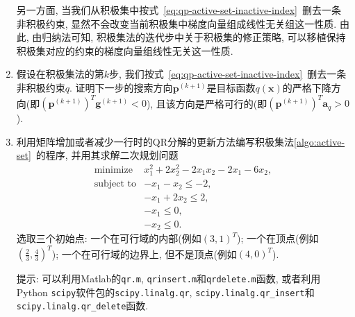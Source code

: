\documentclass{SBCbookchapter}
\newcommand{\V}[1]{{\bm{#1}}}
\numberwithin{equation}{section}
\begin{document}
\begin{enumerate}
另一方面, 当我们从积极集中按式~\eqref{eq:qp-active-set-inactive-index}~删去一条非积极约束, 显然不会改变当前积极集中梯度向量组成线性无关组这一性质. 由此, 由归纳法可知, 积极集法的迭代步中关于积极集的修正策略, 可以移植保持积极集对应的约束的梯度向量组线性无关这一性质.

\item 假设在积极集法的第$k$步, 我们按式~\eqref{eq:qp-active-set-inactive-index}~删去一条非积极约束$q.$ 证明下一步的搜索方向$\V{p}^{(k+1)}$是目标函数$q(\V{x})$的严格下降方向(即$\left( \V{p}^{(k+1)} \right)^T \V{g}^{(k+1)} < 0$), 且该方向是严格可行的(即$\left( \V{p}^{(k+1)} \right)^T \V{a}_q > 0$).

\item 利用矩阵增加或者减少一行时的QR分解的更新方法编写积极集法\ref{algo:active-set}~的程序, 并用其求解二次规划问题
\begin{equation*}
\begin{array}{cl}
\text{minimize} & x_1^2 + 2x_2^2 -2x_1x_2 - 2x_1 - 6x_2, \\
\text{subject to} & -x_1 - x_2 \leqslant -2, \\
& -x_1 + 2x_2 \leqslant 2, \\
& -x_1 \leqslant 0,\\
& -x_2 \leqslant 0.
\end{array}
\end{equation*}
选取三个初始点: 一个在可行域的内部(例如$(3, 1)^T$); 一个在顶点(例如$(\frac{2}{3}, \frac{4}{3})^T$); 一个在可行域的边界上, 但不是顶点(例如$(4, 0)^T$).

提示: 可以利用Matlab的\texttt{qr.m}, \texttt{qrinsert.m}和\texttt{qrdelete.m}函数, 或者利用Python \texttt{scipy}软件包的\texttt{scipy.linalg.qr}, \texttt{scipy.linalg.qr\_insert}和\texttt{scipy.linalg.qr\_delete}函数.


\end{enumerate}




\end{document}

